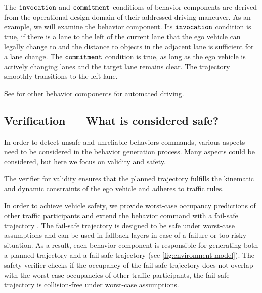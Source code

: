 The $\texttt{invocation}$ and $\texttt{commitment}$ conditions of behavior components are derived from the operational design domain of their addressed driving maneuver.
%
As an example, we will examine the  behavior component.
Its $\texttt{invocation}$ condition is true,
if there is a lane to the left of the current lane that the ego vehicle can legally change to and the distance to objects in the adjacent lane is sufficient for a lane change.
The $\texttt{commitment}$ condition is true, as long as the ego vehicle is actively changing lanes
and the target lane remains clear.
The trajectory smoothly transitions to the left lane.

See \cite{orzechowskiVerhaltensentscheidungFuerAutomatisierte2023} for other behavior components for automated driving.






\subsection{Verification --- What is considered \textbf{safe}?}

In order to detect unsafe and unreliable behaviors commands,
various aspects need to be considered in the behavior generation process.
%
Many aspects could be considered, but here we focus on validity and safety.

The verifier for validity ensures that the planned trajectory fulfills the kinematic and dynamic constraints of the ego vehicle
and adheres to traffic rules.

In order to achieve vehicle safety, we
provide worst-case occupancy predictions of other traffic participants
and extend the behavior command with a fail-safe trajectory \cite{althoffSetBasedPredictionTraffic2016}.
The fail-safe trajectory is designed to be safe under worst-case assumptions
and can be used in fallback layers in case of a failure or too risky situation.
As a result, each behavior component is responsible for generating both
a planned trajectory and a fail-safe trajectory (see \cref{fig:environment-model}).
The safety verifier checks if the occupancy of the fail-safe trajectory does not overlap
with the worst-case occupancies of other traffic participants,
\ie the fail-safe trajectory is collision-free under worst-case assumptions.



